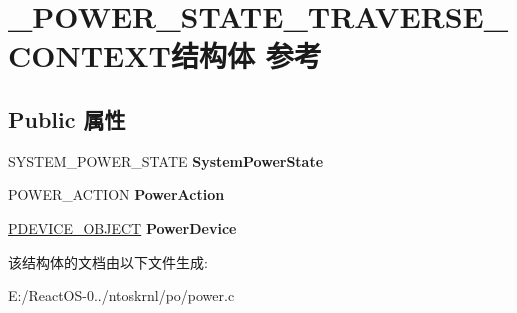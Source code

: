 \hypertarget{struct___p_o_w_e_r___s_t_a_t_e___t_r_a_v_e_r_s_e___c_o_n_t_e_x_t}{}\section{\+\_\+\+P\+O\+W\+E\+R\+\_\+\+S\+T\+A\+T\+E\+\_\+\+T\+R\+A\+V\+E\+R\+S\+E\+\_\+\+C\+O\+N\+T\+E\+X\+T结构体 参考}
\label{struct___p_o_w_e_r___s_t_a_t_e___t_r_a_v_e_r_s_e___c_o_n_t_e_x_t}
\subsection*{Public 属性}
\begin{DoxyCompactItemize}
\item 
\mbox{\label{struct___p_o_w_e_r___s_t_a_t_e___t_r_a_v_e_r_s_e___c_o_n_t_e_x_t_a21f06c203779e374373b506a19813a43}} 
S\+Y\+S\+T\+E\+M\+\_\+\+P\+O\+W\+E\+R\+\_\+\+S\+T\+A\+TE {\bfseries System\+Power\+State}
\item 
\mbox{\label{struct___p_o_w_e_r___s_t_a_t_e___t_r_a_v_e_r_s_e___c_o_n_t_e_x_t_a5e512eedfe1a7c3f51a0c33dfe0fe3fe}} 
P\+O\+W\+E\+R\+\_\+\+A\+C\+T\+I\+ON {\bfseries Power\+Action}
\item 
\mbox{\label{struct___p_o_w_e_r___s_t_a_t_e___t_r_a_v_e_r_s_e___c_o_n_t_e_x_t_adaf101b692b43d9ea3630ded4e359ef3}} 
\hyperlink{struct___d_e_v_i_c_e___o_b_j_e_c_t}{P\+D\+E\+V\+I\+C\+E\+\_\+\+O\+B\+J\+E\+CT} {\bfseries Power\+Device}
\end{DoxyCompactItemize}


该结构体的文档由以下文件生成\+:\begin{DoxyCompactItemize}
\item 
E\+:/\+React\+O\+S-\/0../ntoskrnl/po/power.\+c\end{DoxyCompactItemize}
